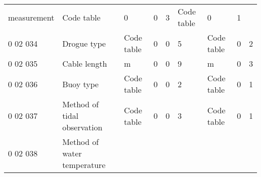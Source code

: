 \begin{longtable}[]{@{}lllllllll@{}}
\begin{minipage}[t]{0.08\columnwidth}
measurement\strut
\end{minipage} & \begin{minipage}[t]{0.08\columnwidth}\raggedright
Code table\strut
\end{minipage} & \begin{minipage}[t]{0.08\columnwidth}\raggedright
0\strut
\end{minipage} & \begin{minipage}[t]{0.08\columnwidth}\raggedright
0\strut
\end{minipage} & \begin{minipage}[t]{0.08\columnwidth}\raggedright
3\strut
\end{minipage} & \begin{minipage}[t]{0.08\columnwidth}\raggedright
Code table\strut
\end{minipage} & \begin{minipage}[t]{0.08\columnwidth}\raggedright
0\strut
\end{minipage} & \begin{minipage}[t]{0.08\columnwidth}\raggedright
1\strut
\end{minipage}\tabularnewline
0 02 034 & Drogue type & Code table & 0 & 0 & 5 & Code table & 0 & 2\tabularnewline
0 02 035 & Cable length & m & 0 & 0 & 9 & m & 0 & 3\tabularnewline
0 02 036 & Buoy type & Code table & 0 & 0 & 2 & Code table & 0 & 1\tabularnewline
0 02 037 & Method of tidal observation & Code table & 0 & 0 & 3 & Code table & 0 & 1\tabularnewline
\begin{minipage}[t]{0.08\columnwidth}\raggedright
0 02 038\strut
\end{minipage} & \begin{minipage}[t]{0.08\columnwidth}\raggedright
Method of water temperature


\end{minipage}
\end{longtable}
